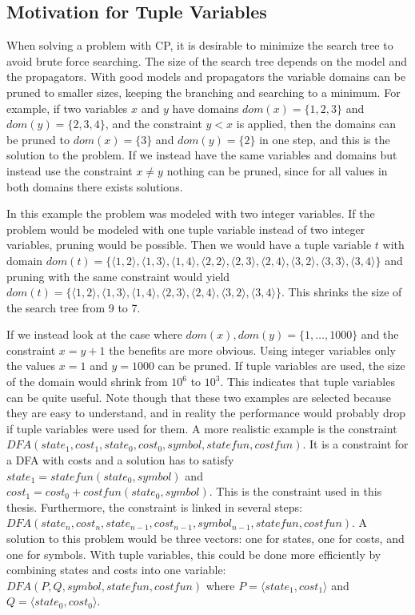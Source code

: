 \documentclass[a4paper,11pt]{article}
\begin{document}
\subsection{Motivation for Tuple Variables}
When solving a problem with CP, it is desirable to minimize the search tree to avoid brute force searching. The size of the search tree depends on the model and the propagators. With good models and propagators the variable domains can be pruned to smaller sizes, keeping the branching and searching to a minimum. For example, if two variables $x$ and $y$ have domains $dom(x)=\{1,2,3\}$ and $dom(y)=\{2,3,4\}$, and the constraint $y<x$ is applied, then the domains can be pruned to $dom(x)=\{3\}$ and $dom(y)=\{2\}$ in one step, and this is the solution to the problem. If we instead have the same variables and domains but instead use the constraint $x\neq y$ nothing can be pruned, since for all values in both domains there exists solutions. 

In this example the problem was modeled with two integer variables. If the problem would be modeled with one tuple variable instead of two integer variables, pruning would be possible. Then we would have a tuple variable $t$ with domain 
$dom(t)=\{
\langle1,2\rangle,\allowbreak 
\langle1,3\rangle,\allowbreak 
\langle1,4\rangle,\allowbreak
\langle2,2\rangle,\allowbreak
\langle2,3\rangle,\allowbreak
\langle2,4\rangle,\allowbreak
\langle3,2\rangle,\allowbreak
\langle3,3\rangle,\allowbreak
\langle3,4\rangle\}$ 
and pruning with the same constraint would yield 
$dom(t)=\{
\langle1,2\rangle,\allowbreak
\langle1,3\rangle,\allowbreak
\langle1,4\rangle,\allowbreak
\langle2,3\rangle,\allowbreak
\langle2,4\rangle,\allowbreak
\langle3,2\rangle,\allowbreak
\langle3,4\rangle\}$. 
This shrinks the size of the search tree from 9 to 7. 

If we instead look at the case where $dom(x),dom(y)=\{1,\ldots,1000\}$ and the constraint $x=y+1$ the benefits are more obvious. Using integer variables only the values $x=1$ and $y=1000$ can be pruned. If tuple variables are used, the size of the domain would shrink from $10^6$ to $10^3$. This indicates that tuple variables can be quite useful. Note though that these two examples are selected because they are easy to understand, and in reality the performance would probably drop if tuple variables were used for them. A more realistic example is the constraint $DFA(state_1, cost_1, state_0, cost_0, symbol, statefun, costfun)$. It is a constraint for a DFA with costs and a solution has to satisfy $state_1= statefun(state_0, symbol)$ and $cost_1=cost_0+costfun(state_0, symbol)$. This is the constraint used in this thesis. Furthermore, the constraint is linked in several steps: $DFA(state_n, cost_n, state_{n-1}, cost_{n-1}, symbol_{n-1}, statefun, costfun)$. A solution to this problem would be three vectors: one for states, one for costs, and one for symbols. With tuple variables, this could be done more efficiently by combining states and costs into one variable: $DFA(P, Q, symbol, statefun, costfun)$ where $P=\langle state_1, cost_1\rangle$ and $Q=\langle state_0, cost_0\rangle$.
\end{document}
